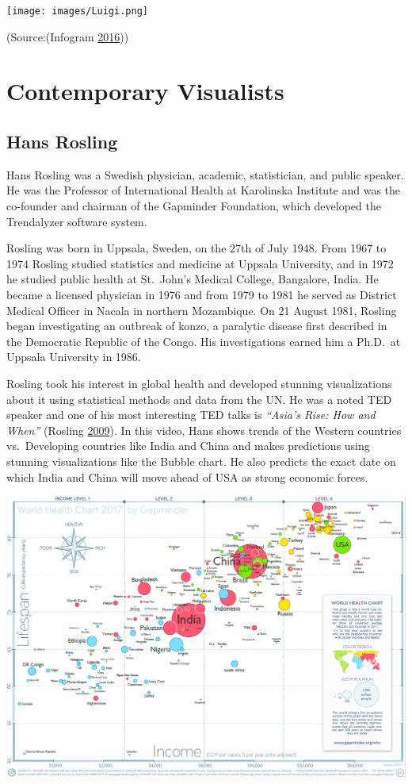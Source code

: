 \documentclass[]{book}
\begin{document}
\texttt{[image: images/Luigi.png]}

(Source:(Infogram \protect\hyperlink{ref-history_viz}{2016}))

\hypertarget{contemporary-visualists}{%
\section{Contemporary Visualists}\label{contemporary-visualists}}

\hypertarget{hans-rosling}{%
\subsection{Hans Rosling}\label{hans-rosling}}

Hans Rosling was a Swedish physician, academic, statistician, and public speaker. He was the Professor of International Health at Karolinska Institute and was the co-founder and chairman of the Gapminder Foundation, which developed the Trendalyzer software system.

Rosling was born in Uppsala, Sweden, on the 27th of July 1948. From 1967 to 1974 Rosling studied statistics and medicine at Uppsala University, and in 1972 he studied public health at St.~John's Medical College, Bangalore, India. He became a licensed physician in 1976 and from 1979 to 1981 he served as District Medical Officer in Nacala in northern Mozambique. On 21 August 1981, Rosling began investigating an outbreak of konzo, a paralytic disease first described in the Democratic Republic of the Congo. His investigations earned him a Ph.D.~at Uppsala University in 1986.

Rosling took his interest in global health and developed stunning visualizations about it using statistical methods and data from the UN. He was a noted TED speaker and one of his most interesting TED talks is \emph{``Asia's Rise: How and When''} (Rosling \protect\hyperlink{ref-hans}{2009}). In this video, Hans shows trends of the Western countries vs.~Developing countries like India and China and makes predictions using stunning visualizations like the Bubble chart. He also predicts the exact date on which India and China will move ahead of USA as strong economic forces.

\includegraphics{images/hans_world_health_chart.png}
\end{document}
